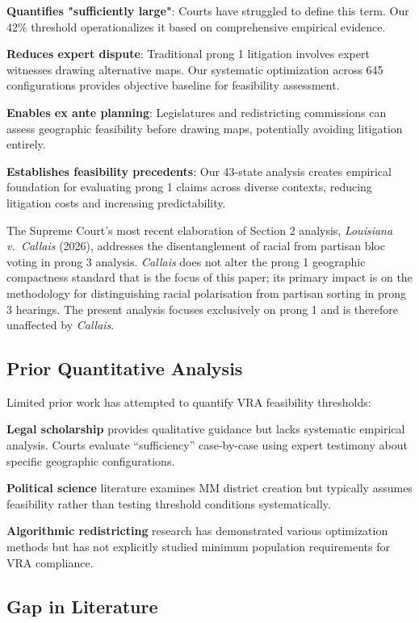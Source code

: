 \textbf{Quantifies "sufficiently large"}: Courts have struggled to define this term. Our 42\% threshold operationalizes it based on comprehensive empirical evidence.

\textbf{Reduces expert dispute}: Traditional prong 1 litigation involves expert witnesses drawing alternative maps. Our systematic optimization across 645 configurations provides objective baseline for feasibility assessment.

\textbf{Enables ex ante planning}: Legislatures and redistricting commissions can assess geographic feasibility before drawing maps, potentially avoiding litigation entirely.

\textbf{Establishes feasibility precedents}: Our 43-state analysis creates empirical foundation for evaluating prong 1 claims across diverse contexts, reducing litigation costs and increasing predictability.

The Supreme Court's most recent elaboration of Section 2 analysis, \emph{Louisiana v.\ Callais} (2026), addresses the disentanglement of racial from partisan bloc voting in prong 3 analysis. \emph{Callais} does not alter the prong 1 geographic compactness standard that is the focus of this paper; its primary impact is on the methodology for distinguishing racial polarisation from partisan sorting in prong 3 hearings. The present analysis focuses exclusively on prong 1 and is therefore unaffected by \emph{Callais}.

\subsection{Prior Quantitative Analysis}

Limited prior work has attempted to quantify VRA feasibility thresholds:

\textbf{Legal scholarship} provides qualitative guidance but lacks systematic empirical analysis. Courts evaluate ``sufficiency'' case-by-case using expert testimony about specific geographic configurations.

\textbf{Political science} literature examines MM district creation but typically assumes feasibility rather than testing threshold conditions systematically.

\textbf{Algorithmic redistricting} research has demonstrated various optimization methods but has not explicitly studied minimum population requirements for VRA compliance.

\subsection{Gap in Literature}

